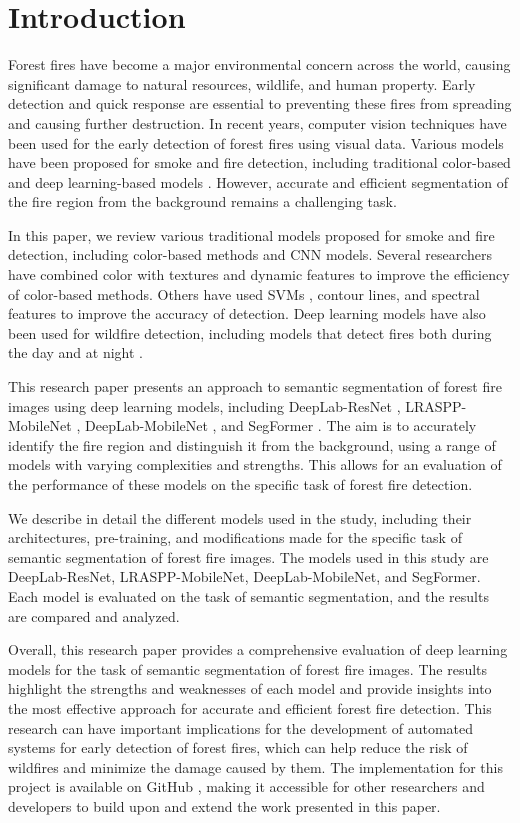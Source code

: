 \section{Introduction}

Forest fires have become a major environmental concern across the world, causing significant damage to natural resources, wildlife, and human property. Early detection and quick response are essential to preventing these fires from spreading and causing further destruction. In recent years, computer vision techniques have been used for the early detection of forest fires using visual data. Various models have been proposed for smoke and fire detection, including traditional color-based and deep learning-based models \cite{vision_pedro}. However, accurate and efficient segmentation of the fire region from the background remains a challenging task.

In this paper, we review various traditional models proposed for smoke and fire detection, including color-based methods and CNN models. Several researchers have combined color with textures and dynamic features \cite{detection_zhao} to improve the efficiency of color-based methods. Others have used SVMs \cite{dynamic_ye}, contour lines, and spectral features \cite{an_robust_2022} to improve the accuracy of detection. Deep learning models have also been used for wildfire detection, including models that detect fires both during the day and at night \cite{calderara_vision_2011}.

This research paper presents an approach to semantic segmentation of forest fire images using deep learning models, including DeepLab-ResNet \cite{chen_rethinking_2017}, LRASPP-MobileNet \cite{howard2019searching}, DeepLab-MobileNet \cite{chen_rethinking_2017}, and SegFormer \cite{xie_segformer_2021}. The aim is to accurately identify the fire region and distinguish it from the background, using a range of models with varying complexities and strengths. This allows for an evaluation of the performance of these models on the specific task of forest fire detection.

We describe in detail the different models used in the study, including their architectures, pre-training, and modifications made for the specific task of semantic segmentation of forest fire images. The models used in this study are DeepLab-ResNet, LRASPP-MobileNet, DeepLab-MobileNet, and SegFormer. Each model is evaluated on the task of semantic segmentation, and the results are compared and analyzed.

Overall, this research paper provides a comprehensive evaluation of deep learning models for the task of semantic segmentation of forest fire images. The results highlight the strengths and weaknesses of each model and provide insights into the most effective approach for accurate and efficient forest fire detection. This research can have important implications for the development of automated systems for early detection of forest fires, which can help reduce the risk of wildfires and minimize the damage caused by them. The implementation for this project is available on GitHub \cite{hamza_saqib}, making it accessible for other researchers and developers to build upon and extend the work presented in this paper.
